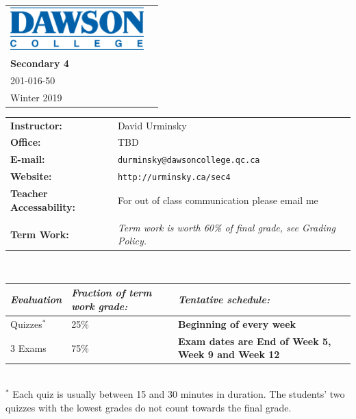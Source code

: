\documentclass[12pt]{article}
\begin{document}
\begin{tabular*}{8in}{@{}p{4.75in}r}
\includegraphics[height=0.65in]{dawson-college-blue.png} &
\raisebox{0.5cm}{
\begin{tabular}{r}
\large\textbf{Mathematics Department}\\
\large\textbf{Secondary 4 }\\
\large 201-016-50 \\
\large Winter 2019
\end{tabular}}
\end{tabular*}

\vspace{0.5in}

\normalsize
\begin{tabular}{@{}p{2in}p{5.25in}}
\textbf{Instructor:} & David Urminsky\\
\textbf{Office:} & TBD\\
\textbf{E-mail:} & \verb+durminsky@dawsoncollege.qc.ca+\\
\textbf{Website:} & \verb+http://urminsky.ca/sec4+\\
\textbf{Teacher Accessability:} & For out of class communication please email me\\\\
\textbf{Term Work:}&\textit{Term work is worth 60\% of final grade, see Grading Policy.}\\
\end{tabular}\\
\begin{tabular}{l|p{2in}|p{4.15in}}
\textit{Evaluation} & \textit{Fraction of term work grade:} & \textit{Tentative schedule:}\\
\hline
Quizzes$^{*}$ & 25\% & \textbf{Beginning of every week}\\
3 Exams & 75\% & \textbf{Exam dates are End of Week 5, Week 9 and Week 12}\\
\end{tabular}\\
$^{*}$ Each quiz is usually between 15 and 30 minutes in duration. The students' two quizzes with the lowest grades do
not count towards the final grade.\\
\end{document}
